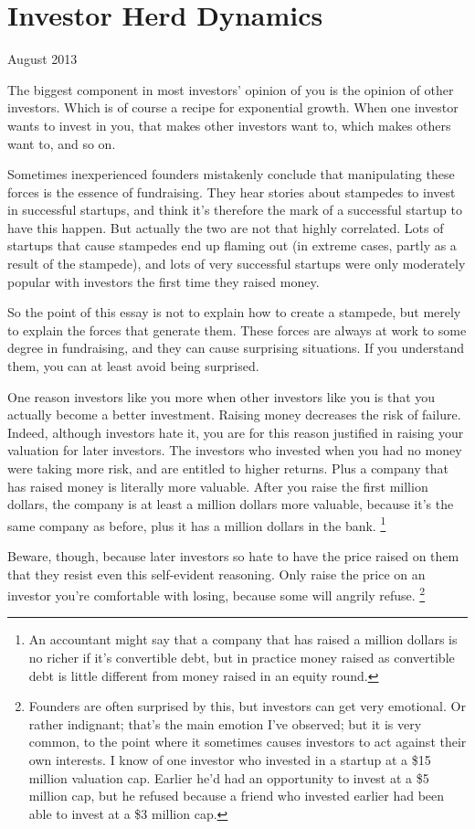 \chapter{Investor Herd Dynamics}

August 2013

The biggest component in most investors' opinion of you is the opinion
of other investors. Which is of course a recipe for exponential growth.
When one investor wants to invest in you, that makes other investors
want to, which makes others want to, and so on.

Sometimes inexperienced founders mistakenly conclude that manipulating
these forces is the essence of fundraising. They hear stories about
stampedes to invest in successful startups, and think it's therefore the
mark of a successful startup to have this happen. But actually the two
are not that highly correlated. Lots of startups that cause stampedes
end up flaming out (in extreme cases, partly as a result of the
stampede), and lots of very successful startups were only moderately
popular with investors the first time they raised money.

So the point of this essay is not to explain how to create a stampede,
but merely to explain the forces that generate them. These forces are
always at work to some degree in fundraising, and they can cause
surprising situations. If you understand them, you can at least avoid
being surprised.

One reason investors like you more when other investors like you is that
you actually become a better investment. Raising money decreases the
risk of failure. Indeed, although investors hate it, you are for this
reason justified in raising your valuation for later investors. The
investors who invested when you had no money were taking more risk, and
are entitled to higher returns. Plus a company that has raised money is
literally more valuable. After you raise the first million dollars, the
company is at least a million dollars more valuable, because it's the
same company as before, plus it has a million dollars in the bank.
\footnote{An accountant might say that a company that has raised a million
dollars is no richer if it's convertible debt, but in practice money
raised as convertible debt is little different from money raised in an
equity round.}

Beware, though, because later investors so hate to have the price raised
on them that they resist even this self-evident reasoning. Only raise
the price on an investor you're comfortable with losing, because some
will angrily refuse. \footnote{Founders are often surprised by this, but investors can get very
emotional. Or rather indignant; that's the main emotion I've observed;
but it is very common, to the point where it sometimes causes investors
to act against their own interests. I know of one investor who invested
in a startup at a \$15 million valuation cap. Earlier he'd had an
opportunity to invest at a \$5 million cap, but he refused because a
friend who invested earlier had been able to invest at a \$3 million
cap.}

